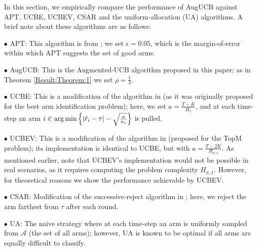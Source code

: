 
In this section, we empirically compare the  performance of AugUCB against APT, UCBE, UCBEV, CSAR and the uniform-allocation (UA) algorithms. A brief note about these algorithms are as follows:

$\bullet$ APT: This algorithm is from \cite{locatelli2016optimal}; we set $\epsilon=0.05$, which is the margin-of-error within which APT suggests the set of good arms.

$\bullet$ AugUCB: This is the Augmented-UCB algorithm proposed in this paper; as in Theorem \ref{Result:Theorem:1} we set $\rho=\frac{1}{3}$.

$\bullet$ UCBE: This is a modification of the algorithm in \cite{audibert2009exploration} (as it was originally proposed for the best arm identification problem); here, we set $a=\frac{T-K}{H_1}$, and at each time-step an arm $i\in\operatorname*{arg\,min}\left\lbrace |\hat{r}_{i} -\tau|-\sqrt{\frac{a}{n_{i}}} \right\rbrace$ is pulled.

$\bullet$ UCBEV: This is a modification of the algorithm in \cite{gabillon2011multi} (proposed for the TopM problem); its implementation is identical to UCBE, but with $a = \frac{T-2K}{H_{\sigma,1}}$. As mentioned earlier, note that UCBEV's implementation would not be possible in real scenarios, as it requires computing the problem complexity $H_{\sigma,1}$. However, for theoretical reasons we show the performance achievable by UCBEV.

$\bullet$ CSAR:  Modification of the successive-reject algorithm in \cite{chen2014combinatorial}; here, we reject the arm farthest from $\tau$ after each round. 

$\bullet$ UA: The naive strategy where at each time-step an arm is uniformly sampled from $\mathcal{A}$ (the set of all arms); however, UA is known to be optimal if all arms are equally difficult to classify. 


